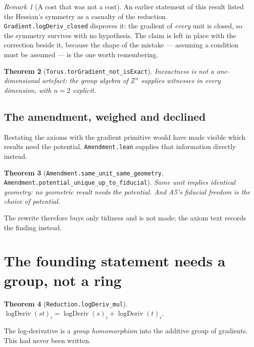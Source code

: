 \documentclass[11pt,a4paper]{article}
\newtheorem{theorem}{Theorem}[section]
\theoremstyle{definition}
\theoremstyle{remark}
\newtheorem{remark}[theorem]{Remark}
\newcommand{\lean}[1]{\texttt{\small #1}}
\begin{document}
\begin{remark}[A cost that was not a cost]
An earlier statement of this result listed the Hessian's symmetry as a casualty of
the reduction. \lean{Gradient.logDeriv\_closed} disproves it: the gradient of
\emph{every} unit is closed, so the symmetry survives with no hypothesis. The claim
is left in place with the correction beside it, because the shape of the mistake
--- assuming a condition must be assumed --- is the one worth remembering.
\end{remark}

\begin{theorem}[\lean{Torus.torGradient\_not\_isExact}]
Inexactness is not a one-dimensional artefact: the group algebra of
$\mathbb{Z}^{n}$ supplies witnesses in every dimension, with $n=2$ explicit.
\end{theorem}

\subsection{The amendment, weighed and declined}

Restating the axioms with the gradient primitive would have made visible which
results need the potential. \lean{Amendment.lean} supplies that information
directly instead.

\begin{theorem}[\lean{Amendment.same\_unit\_same\_geometry},
\lean{Amendment.potential\_unique\_up\_to\_fiducial}]
Same unit implies identical geometry: \emph{no} geometric result needs the
potential. And A5's fiducial freedom \emph{is} the choice of potential.
\end{theorem}

The rewrite therefore buys only tidiness and is not made; the axiom text records
the finding instead.

\section{The founding statement needs a group, not a ring}
\label{sec:reduction}

\begin{theorem}[\lean{Reduction.logDeriv\_mul}]
$\operatorname{logDeriv}(st)_i=\operatorname{logDeriv}(s)_i+
\operatorname{logDeriv}(t)_i$.
\end{theorem}

The log-derivative is a \emph{group homomorphism} into the additive group of
gradients. This had never been written.
\end{document}
